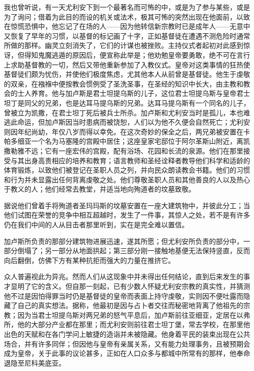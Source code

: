 我也曾听说，有一天尤利安下到一个最著名而可怖的中，或是为了参与某些，或是为了询问；借着为此目的而设的机关或法术，极其可怖的突然出现在他面前，以致在惊慌恐惧中，他忘记了在场的人——因为他转信新宗教时已是成年人——无意中又恢复了早年的习惯，以基督的标记画了十字，正如基督徒在遭遇不测危险时通常所做的那样。幽灵立刻消失了，它们的计谋也被挫败。主持仪式者起初对此感到惊讶，但得知鬼魔逃遁的原因后，便宣称此举是；他劝勉皇帝要勇敢，绝不可在言行上求助基督教的一切，然后又带他重新参加了入教仪式。皇帝对这类事情的狂热使基督徒们颇为忧伤，并使他们极度焦虑，尤其他本人从前曾是基督徒。他生于虔敬的双亲，在襁褓中便按教会惯例受了圣洗圣事，在圣经的知识中长大，由主教和教会的士人养育。他与加卢斯是君士坦提乌斯的儿子，这位君士坦提乌斯与皇帝君士坦丁是同父的兄弟，也是达耳马提乌斯的兄弟。达耳马提乌斯有一个同名的儿子，曾被立为凯撒，在君士坦丁死后被兵士所杀。加卢斯和尤利安当时是孤儿，本也难逃此命运，但加卢斯因当时患病而被饶恕，人们以为他不久便会自然死亡；尤利安则因年纪尚幼，年仅八岁而得以幸免。在这次奇妙的保全之后，两兄弟被安置在卡帕多细亚一个名为马塞隆的宫殿中居住；这座皇家宅邸位于阿尔革斯山附近，离凯撒勒雅不远；它有一座宏伟的宫殿，配有浴场、花园和长流的泉源。他们在那里接受与其出身高贵相应的培养和教育；语言教师和圣经诠释者教导他们科学和适龄的体育锻炼，以致他们被登记在圣职人员之列，并向民众朗读教会书籍。他们的习惯和行为并未显露出任何背离虔敬之处。他们尊敬圣职人员和其他善良的人以及热心于教义的人；他们经常去教堂，并适当地向殉道者的坟墓致敬。\par

据说他们曾着手将殉道者圣玛玛斯的坟墓安置在一座大建筑物中，并彼此分工；当他们试图在荣誉的竞争中相互超越时，发生了一件事，其惊人之处，若不是有许多仍在我们中间的人从目击者那里听到，实在是完全难以置信。\par

加卢斯所负责的那部分建筑物进展迅速，遂其所愿；但尤利安所负责的部分中，一部分倒塌了；另一部分从地面拱起；第三部分刚一接触地基便无法保持竖直，反而向后翻倒，仿佛下方有某种抗拒而强大的力量在推挤它。\par

众人普遍视此为异兆。然而人们从这现象中并未得出任何结论，直到后来发生的事才显明了它的含义。但自那一刻起，已有少数人怀疑尤利安宗教的真实性，并猜测他不过是因怕得罪当时仍是基督徒的皇帝而表面上持守虔敬，实则因不便吐露而隐藏了自己的真实想法。据称，他最初是因与占卜者交往而秘密地背离了他祖先的宗教；因为当君士坦提乌斯对两兄弟的怒气平息后，加卢斯前往亚细亚，定居在以弗所，他的大部分产业都在那里；而尤利安则前往君士坦丁堡，常去学校，在那里他出色的天赋和在各门学问上敏捷的造诣并未被隐藏。他身着平民的装束出现在公共场合，并有许多同伴；但因他与皇帝有亲属关系，又有能力处理事务，且被预期会成为皇帝，关于此事的议论甚多，正如在人口众多与都城中所常有的那样，他奉命退隐至尼科美底亚。\par

